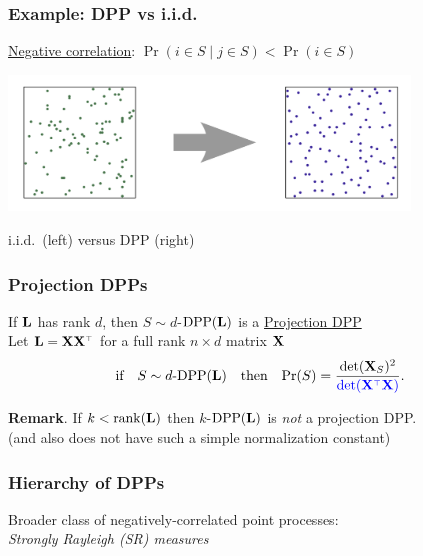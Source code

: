 \documentclass[handout]{beamer}
\begin{document}
\begin{frame}
  \frametitle{Example: DPP vs i.i.d.}
  \underline{Negative correlation}:
  $\Pr(i\in S\mid j\in S) < \Pr(i\in S)$
  \pause
\begin{center}
  \includegraphics[width=0.8\textwidth]{../figs/gue.png}
  
  \small  i.i.d.~(left) versus DPP (right)%
  \end{center}
    \let\thefootnote\relax{}
\end{frame}


\begin{frame}
  \frametitle{Projection DPPs}
  If $\mathbf{L}$ has rank $d$, then $S\sim d$-${\mathrm{DPP}}(\mathbf{L})$ is a
  \underline{Projection DPP}\\[10mm]\pause
Let $\L=\X\X^\top$ for a full rank $n\times d$ matrix $\mathbf X$\vspace{-2mm}
\begin{align*}
\text{if}\quad S\sim d\text{-}\DPP(\L)\quad\text{then}\quad\Pr(S) = \frac{\det(\X_S)^2}{\Blue{\det(\X^\top\X)}}.
\end{align*}
\vspace{-4mm}
\pause

\pause
\vspace{10mm}

\textbf{Remark}. If $k<\mathrm{rank}(\mathbf{L})$ then $k$-${\mathrm{DPP}}(\mathbf{L})$ is \emph{not} a
projection DPP.\\
(and also does not have such a simple normalization constant)
\end{frame}

\begin{frame}
  \frametitle{Hierarchy of DPPs}
  Broader class of negatively-correlated point processes:\\
  \textit{Strongly Rayleigh (SR) measures}
  \vspace{5mm}
  
\begin{center}
  \end{center}
\end{frame}
\end{document}
